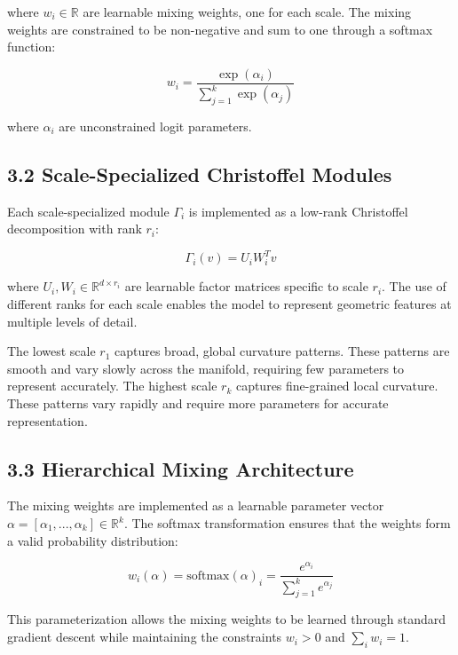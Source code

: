 \documentclass[12pt]{article}
\begin{document}
where $w_i \in \mathbb{R}$ are learnable mixing weights, one for each scale. The mixing weights are constrained to be non-negative and sum to one through a softmax function:

\begin{equation}
w_i = \frac{\exp(\alpha_i)}{\sum_{j=1}^k \exp(\alpha_j)}
\end{equation}

where $\alpha_i$ are unconstrained logit parameters.

\subsection{3.2 Scale-Specialized Christoffel Modules}

Each scale-specialized module $\Gamma_i$ is implemented as a low-rank Christoffel decomposition with rank $r_i$:

\begin{equation}
\Gamma_i(v) = U_i W_i^T v
\end{equation}

where $U_i, W_i \in \mathbb{R}^{d \times r_i}$ are learnable factor matrices specific to scale $r_i$. The use of different ranks for each scale enables the model to represent geometric features at multiple levels of detail.

The lowest scale $r_1$ captures broad, global curvature patterns. These patterns are smooth and vary slowly across the manifold, requiring few parameters to represent accurately. The highest scale $r_k$ captures fine-grained local curvature. These patterns vary rapidly and require more parameters for accurate representation.

\subsection{3.3 Hierarchical Mixing Architecture}

The mixing weights are implemented as a learnable parameter vector $\alpha = [\alpha_1, ..., \alpha_k] \in \mathbb{R}^k$. The softmax transformation ensures that the weights form a valid probability distribution:

\begin{equation}
w_i(\alpha) = \text{softmax}(\alpha)_i = \frac{e^{\alpha_i}}{\sum_{j=1}^k e^{\alpha_j}}
\end{equation}

This parameterization allows the mixing weights to be learned through standard gradient descent while maintaining the constraints $w_i > 0$ and $\sum_i w_i = 1$.
\end{document}
